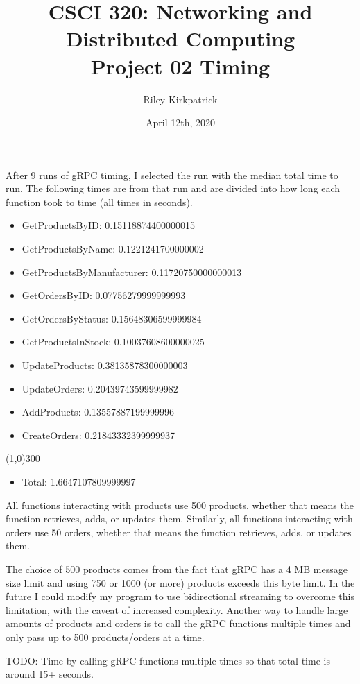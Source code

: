 \documentclass[12pt]{article}
\begin{document}
 \title{CSCI 320: Networking and Distributed Computing \\ Project 02 Timing}
 \author{Riley Kirkpatrick}
 \date{April 12th, 2020}
 
 \maketitle

After 9 runs of gRPC timing, I selected the run with the median total time to run.
The following times are from that run and are divided into how long each function took to time (all times in seconds).
\begin{itemize}
\item[] GetProductsByID: 0.15118874400000015
\item[] GetProductsByName: 0.1221241700000002
\item[] GetProductsByManufacturer: 0.11720750000000013
\item[] GetOrdersByID: 0.07756279999999993
\item[] GetOrdersByStatus: 0.15648306599999984
\item[] GetProductsInStock: 0.10037608600000025
\item[] UpdateProducts: 0.38135878300000003
\item[] UpdateOrders: 0.20439743599999982
\item[] AddProducts: 0.13557887199999996
\item[] CreateOrders: 0.21843332399999937
\end{itemize}

\vspace{-1em}
\line(1,0){300}
\vspace{-1em}

\begin{itemize}
\item[] Total: 1.6647107809999997
\end{itemize}


\noindent All functions interacting with products use 500 products, whether that means the function retrieves, adds, or updates them.
Similarly, all functions interacting with orders use 50 orders, whether that means the function retrieves, adds, or updates them.


The choice of 500 products comes from the fact that gRPC has a 4 MB message size limit and using 750 or 1000 (or more) products exceeds this byte limit.
In the future I could modify my program to use bidirectional streaming to overcome this limitation, with the caveat of increased complexity.
Another way to handle large amounts of products and orders is to call the gRPC functions multiple times and only pass up to 500 products/orders at a time.


TODO: Time by calling gRPC functions multiple times so that total time is around 15+ seconds.
\end{document}

